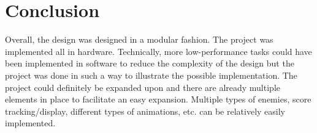\section{Conclusion}
\quad
Overall, the design was designed in a modular fashion.
The project was implemented all in hardware.
Technically, more low-performance tasks could have been implemented in software to reduce the complexity of the design but the project was done in such a way to illustrate the possible implementation.
The project could definitely be expanded upon and there are already multiple elements in place to facilitate an easy expansion.
Multiple types of enemies, score tracking/display, different types of animations, etc. can be relatively easily implemented. 
